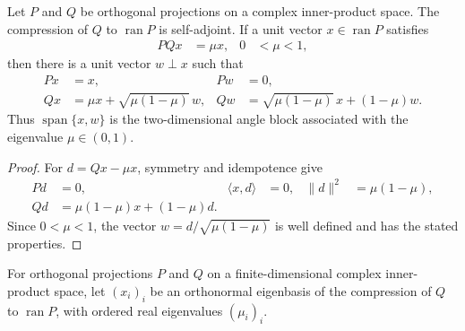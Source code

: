 \begin{lemma}
    \label{thm:mpu_two_projection_angle_block}
    \leanok

    Let $P$ and $Q$ be orthogonal projections on a complex inner-product space.
    The compression of $Q$ to $\operatorname{ran}P$ is self-adjoint. If a unit
    vector $x\in\operatorname{ran}P$ satisfies
    \begin{align}
        PQx & =\mu x, & 0 & <\mu<1,
    \end{align}
    then there is a unit vector $w\perp x$ such that
    \begin{align}
        Px & =x,                             & Pw & =0, \\
        Qx & =\mu x+\sqrt{\mu(1-\mu)}\,w,    &
        Qw & =\sqrt{\mu(1-\mu)}\,x+(1-\mu)w.
    \end{align}
    Thus $\operatorname{span}\{x,w\}$ is the two-dimensional angle block
    associated with the eigenvalue $\mu\in(0,1)$.
\end{lemma}

\begin{proof}\leanok
    For $d=Qx-\mu x$, symmetry and idempotence give
    \begin{align}
        Pd               & =0,                    & \langle x,d\rangle & =0, &
        \lVert d\rVert^2 & =\mu(1-\mu),                                        \\
        Qd               & =\mu(1-\mu)x+(1-\mu)d.
    \end{align}
    Since $0<\mu<1$, the vector
    $w=d/\sqrt{\mu(1-\mu)}$ is well defined and has the stated properties.
\end{proof}

\begin{definition}
    \label{def:mpu_two_projection_compression_spectral_data}
    \leanok
    For orthogonal projections $P$ and $Q$ on a finite-dimensional complex
    inner-product space, let $(x_i)_i$ be an orthonormal eigenbasis of the
    compression of $Q$ to $\operatorname{ran}P$, with ordered real eigenvalues
    $(\mu_i)_i$.
\end{definition}

